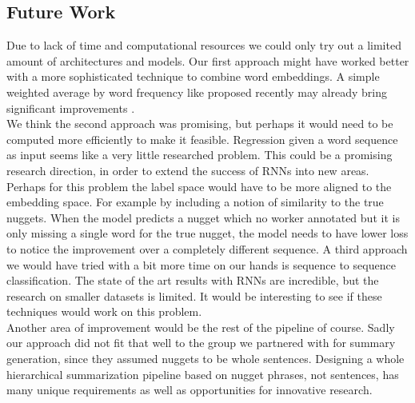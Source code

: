 \subsection{Future Work}
Due to lack of time and computational resources we could only try out a  limited amount of architectures and models.
Our first approach might have worked better with a more sophisticated technique to combine word embeddings. A simple weighted average by word frequency like proposed recently may already bring significant improvements \cite{sif2016}.\\
We think the second approach was promising, but perhaps it would need to be computed more efficiently to make it feasible. Regression given a word sequence as input seems like a very little researched problem. This could be a promising research direction, in order to extend the success of RNNs into new areas. Perhaps for this problem the label space would have to be more aligned to the embedding space. For example by including a notion of similarity to the true nuggets. When the model predicts a nugget which no worker annotated but it is only missing a single word for the true nugget, the model needs to have lower loss to notice the improvement over a completely different sequence.
A third approach we would have tried with a bit more time on our hands is sequence to sequence classification. The state of the art results with RNNs are incredible, but the research on smaller datasets is limited. It would be interesting to see if these techniques would work on this problem.\\
Another area of improvement would be the rest of the pipeline of course. Sadly our approach did not fit that well to the group we partnered with for summary generation, since they assumed nuggets to be whole sentences. Designing a whole hierarchical summarization pipeline based on nugget phrases, not sentences, has many unique requirements as well as opportunities for innovative research.